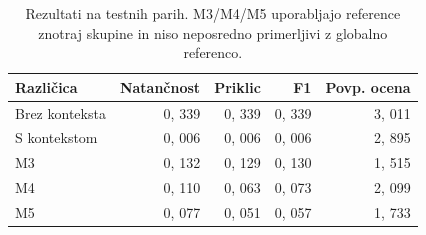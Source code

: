 \begin{table}[h]
\centering
\caption{Rezultati na testnih parih. M3/M4/M5 uporabljajo reference znotraj skupine in niso neposredno primerljivi z globalno referenco.}
\label{tab:table_4_5}
\begin{tabular}{lrrrr}
\toprule
Različica & Natančnost & Priklic & F1 & Povp. ocena \\
\midrule
Brez konteksta & 0, 339 & 0, 339 & 0, 339 & 3, 011 \\
S kontekstom & 0, 006 & 0, 006 & 0, 006 & 2, 895 \\
M3 & 0, 132 & 0, 129 & 0, 130 & 1, 515 \\
M4 & 0, 110 & 0, 063 & 0, 073 & 2, 099 \\
M5 & 0, 077 & 0, 051 & 0, 057 & 1, 733 \\
\bottomrule
\end{tabular}

\end{table}
